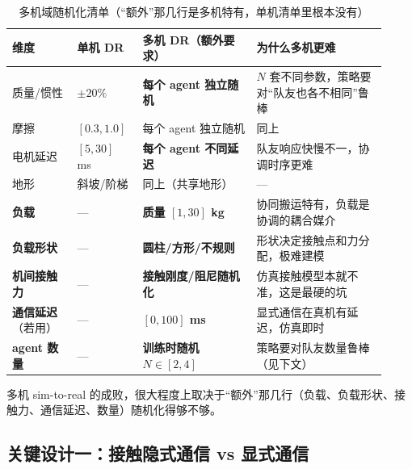 \begin{table}[H]\centering\small
\caption{多机域随机化清单（“额外”那几行是多机特有，单机清单里根本没有）}
\label{tab:mc-dr}
\begin{tabular}{p{0.16\linewidth}p{0.16\linewidth}p{0.28\linewidth}p{0.32\linewidth}}
\toprule
维度 & 单机 DR & 多机 DR（额外要求） & 为什么多机更难 \\
\midrule
质量/惯性 & $\pm 20\%$ & \textbf{每个 agent 独立随机} & $N$ 套不同参数，策略要对“队友也各不相同”鲁棒 \\
摩擦 & $[0.3,1.0]$ & 每个 agent 独立随机 & 同上 \\
电机延迟 & $[5,30]$ ms & \textbf{每个 agent 不同延迟} & 队友响应快慢不一，协调时序更难 \\
地形 & 斜坡/阶梯 & 同上（共享地形） & --- \\
\textbf{负载} & --- & \textbf{质量 $[1,30]$ kg} & 协同搬运特有，负载是协调的耦合媒介 \\
\textbf{负载形状} & --- & \textbf{圆柱/方形/不规则} & 形状决定接触点和力分配，极难建模 \\
\textbf{机间接触力} & --- & \textbf{接触刚度/阻尼随机化} & 仿真接触模型本就不准，这是最硬的坑 \\
\textbf{通信延迟}（若用） & --- & \textbf{$[0,100]$ ms} & 显式通信在真机有延迟，仿真即时 \\
\textbf{agent 数量} & --- & \textbf{训练时随机 $N\in[2,4]$} & 策略要对队友数量鲁棒（见下文） \\
\bottomrule
\end{tabular}
\end{table}

\noindent 多机 sim-to-real 的成败，很大程度上取决于“额外”那几行（负载、负载形状、接触力、通信延迟、数量）随机化得够不够。

\subsection{关键设计一：接触隐式通信 vs 显式通信}
\label{sec:mc-implicit-comm}

